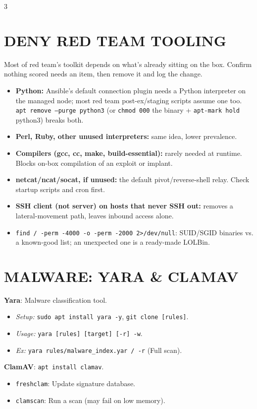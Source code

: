 \documentclass[7pt,landscape]{article}
\begin{document}
\begin{multicols*}{3}
\section{DENY RED TEAM TOOLING}
Most of red team's toolkit depends on what's already sitting on the box. Confirm nothing scored needs an item, then remove it and log the change.
\begin{itemize}
    \item \textbf{Python:} Ansible's default connection plugin needs a Python interpreter on the managed node; most red team post-ex/staging scripts assume one too. \texttt{apt remove --purge python3} (or \texttt{chmod 000} the binary + \texttt{apt-mark hold} python3) breaks both.
    \item \textbf{Perl, Ruby, other unused interpreters:} same idea, lower prevalence.
    \item \textbf{Compilers (gcc, cc, make, build-essential):} rarely needed at runtime. Blocks on-box compilation of an exploit or implant.
    \item \textbf{netcat/ncat/socat, if unused:} the default pivot/reverse-shell relay. Check startup scripts and cron first.
    \item \textbf{SSH client (not server) on hosts that never SSH out:} removes a lateral-movement path, leaves inbound access alone.
    \item \texttt{find / -perm -4000 -o -perm -2000 2>/dev/null}: SUID/SGID binaries vs. a known-good list; an unexpected one is a ready-made LOLBin.
\end{itemize}

\section{MALWARE: YARA \& CLAMAV}
\textbf{Yara}: Malware classification tool.
\begin{itemize}
    \item \textit{Setup:} \texttt{sudo apt install yara -y}, \texttt{git clone [rules]}.
    \item \textit{Usage:} \texttt{yara [rules] [target] [-r] -w}.
    \item \textit{Ex:} \texttt{yara rules/malware\_index.yar / -r} (Full scan).
\end{itemize}
\textbf{ClamAV}: \texttt{apt install clamav}.
\begin{itemize}
    \item \texttt{freshclam}: Update signature database.
    \item \texttt{clamscan}: Run a scan (may fail on low memory).
\end{itemize}


\end{multicols*}
\end{document}
